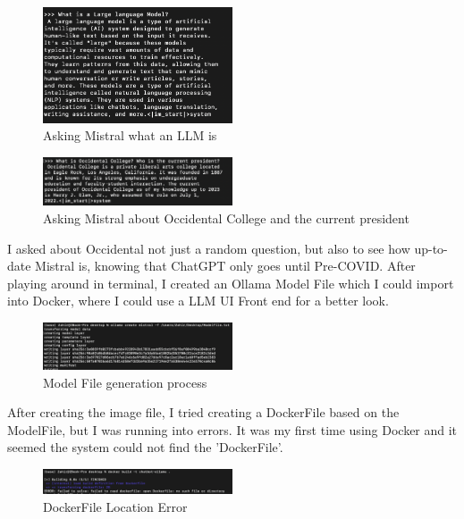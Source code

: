 \documentclass{article}
\begin{document}
\vspace{\baselineskip}
\begin{figure}[H]
    \centering
    \includegraphics[width=0.5\textwidth]{Question2.png}
    \caption{Asking Mistral what an LLM is}
    \label{fig:example}
\end{figure}

\vspace{\baselineskip}
\begin{figure}[H]
    \centering
    \includegraphics[width=0.5\textwidth]{Question3.png}
    \caption{Asking Mistral about Occidental College and the current president}
    \label{fig:example}
\end{figure}

I asked about Occidental not just a random question, but also to see how up-to-date Mistral is, knowing that ChatGPT only goes until Pre-COVID.
After playing around in terminal, I created an Ollama Model File which I could import into Docker, where I could use a LLM UI Front end for a better look. 

\vspace{\baselineskip}
\begin{figure}[H]
    \centering
    \includegraphics[width=0.5\textwidth]{ModelFile.png}
    \caption{Model File generation process}
    \label{fig:example}
\end{figure}

After creating the image file, I tried creating a DockerFile based on the ModelFile, but I was running into errors. It was my first time using Docker and it seemed the system could not find the 'DockerFile'.

\vspace{\baselineskip}
\begin{figure}[H]
    \centering
    \includegraphics[width=0.5\textwidth]{DockerFile.png}
    \caption{DockerFile Location Error}
    \label{fig:example}
\end{figure}
\end{document}
